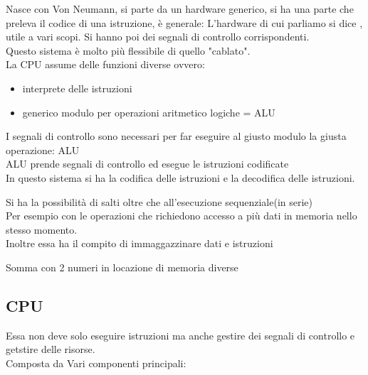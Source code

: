 \documentclass[12pt, a4paper]{article}
\begin{document}
\begin{defn}
	Nasce con Von Neumann, si parte da un hardware generico, 
	si ha una parte che preleva il codice di una istruzione, è generale:
	L'hardware di cui parliamo si dice , utile a vari scopi.
	Si hanno poi dei segnali di controllo corrispondenti.\\
	Questo sistema è molto più flessibile di quello "cablato".\\
	La CPU assume delle funzioni diverse ovvero:
	
	\begin{itemize}
	\item interprete delle istruzioni
	\item generico modulo per operazioni aritmetico logiche = ALU
	\end{itemize}
	I segnali di controllo sono necessari per far eseguire 
	al giusto modulo la giusta operazione: ALU\\
	ALU prende segnali di controllo ed esegue le istruzioni codificate\\
	In questo sistema si ha la codifica 
	delle istruzioni e la decodifica delle istruzioni.

\end{defn}



\begin{defn}
Si ha la possibilità di salti oltre che all'esecuzione sequenziale(in serie)\\
Per esempio con le operazioni che richiedono accesso a più dati in memoria
nello stesso momento.\\
Inoltre essa ha il compito di immaggazzinare dati e istruzioni
\end{defn}

\begin{esem}
Somma con 2 numeri in locazione di memoria diverse
\end{esem}

\subsection{CPU}
Essa non deve solo eseguire istruzioni ma anche gestire dei segnali di controllo e 
getstire delle risorse.\\
Composta da Vari componenti principali:
\end{document}
